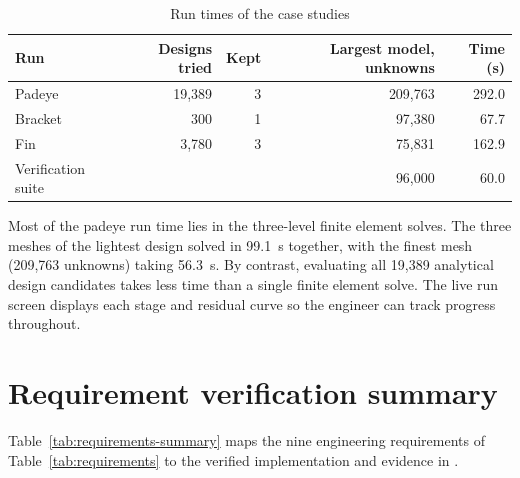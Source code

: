 \begin{table}[H]
\centering
\caption{Run times of the case studies}
\label{tab:run-times}
\small
\begin{tabular}{lrrrr}
\toprule
\textbf{Run} & \textbf{Designs tried} & \textbf{Kept} & \textbf{Largest model, unknowns} & \textbf{Time (s)}\\
\midrule
Padeye & 19,389 & 3 & 209,763 & 292.0\\
Bracket & 300 & 1 & 97,380 & 67.7\\
Fin & 3,780 & 3 & 75,831 & 162.9\\
Verification suite & & & 96,000 & 60.0\\
\bottomrule
\end{tabular}
\end{table}

Most of the padeye run time lies in the three-level finite element solves.
The three meshes of the lightest design solved in 99.1~s together, with the
finest mesh (209,763 unknowns) taking 56.3~s. By contrast, evaluating all
19,389 analytical design candidates takes less time than a single finite
element solve. The live run screen displays each stage and residual curve so
the engineer can track progress throughout.

\section{Requirement verification summary}
\label{sec:requirements-summary}

Table~\ref{tab:requirements-summary} maps the nine engineering requirements of
Table~\ref{tab:requirements} to the verified implementation and evidence in
\NEMO{}.


